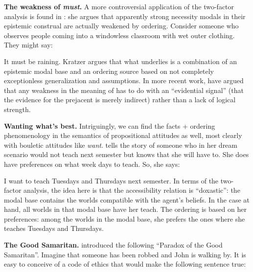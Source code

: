 \textbf{The weakness of \emph{must}.} A more controversial application of the two-factor analysis is found in
\cite{kratzer-1991-modality}: she argues that apparently strong necessity modals
in their epistemic construal are actually weakened by ordering. Consider someone
who observes people coming into a windowless classroom with wet outer clothing.
They might say:

\ex It must be raining. \xe
%
Kratzer argues that what underlies \Last is a combination of an epistemic modal
base and an ordering source based on not completely exceptionless generalization
and assumptions. %
%
In more recent work, \cite{fintel-gillies-2010-mss} have argued that any
weakness in the meaning of \Last has to do with an ``evidential signal'' (that
the evidence for the prejacent is merely indirect) rather than a lack of logical
strength.

\textbf{Wanting what's best.} Intriguingly, we can find the facts + ordering phenomenology in the semantics of
propositional attitudes as well, most clearly with bouletic attitudes like
\emph{want}. \cite{heim-1992-attitude} tells the story of someone who in her
dream scenario would not teach next semester but knows that she will have to.
She does have preferences on what week days to teach. So, she says:

\ex I want to teach Tuesdays and Thursdays next semester.\xe
%
%
In terms of the two-factor analysis, the idea here is that the accessibility
relation is ``doxastic'': the modal base contains the worlds compatible with the
agent's beliefs. In the case at hand, all worlds in that modal base have her
teach. The ordering is based on her preferences: among the worlds in the modal
base, she prefers the ones where she teaches Tuesdays and Thursdays.

\textbf{The Good Samaritan.} \cite{prior-1958-escapism} introduced the following
``Paradox of the Good Samaritan''. Imagine that someone has been robbed and John
is walking by. It is easy to conceive of a code of ethics that would make the
following sentence true:

